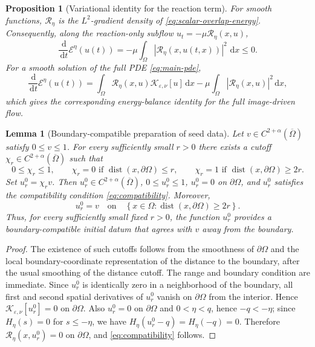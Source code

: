\documentclass[11pt]{article}
\newtheorem{proposition}[theorem]{Proposition}
\newtheorem{lemma}[theorem]{Lemma}
\theoremstyle{remark}
\newcommand{\eps}{\varepsilon}
\newcommand{\nupar}{\nu}
\newcommand{\dd}{\,\mathrm{d}}
\newcommand{\cK}{\mathcal{K}}
\newcommand{\cT}{\mathcal{R}}
\newcommand{\cE}{\mathcal{E}}
\begin{document}
\begin{proposition}[Variational identity for the reaction term]\label{prop:energy}
For smooth functions, $\cT_\eta$ is the $L^2$-gradient density of \eqref{eq:scalar-overlap-energy}.  Consequently, along the reaction-only subflow $u_t=-\mu\cT_\eta(x,u)$,
\begin{equation}\label{eq:energy-dissipation}
        \frac{\dd}{\dd t}\cE^\eta(u(t))
        =-\mu\int_\Omega |\cT_\eta(x,u(t,x))|^2\,\dd x\le0.
\end{equation}
For a smooth solution of the full PDE \eqref{eq:main-pde},
\[
        \frac{\dd}{\dd t}\cE^\eta(u(t))
        =\int_\Omega\cT_\eta(x,u)\cK_{\eps,\nupar}[u] \dd x
        -\mu\int_\Omega |\cT_\eta(x,u)|^2\dd x,
\]
which gives the corresponding energy-balance identity for the full image-driven flow.
\end{proposition}

\begin{lemma}[Boundary-compatible preparation of seed data]\label{lem:seed-preparation}
Let $v\in C^{2+\alpha}(\overline\Omega)$ satisfy $0\le v\le1$.  For every sufficiently small $r>0$ there exists a cutoff $\chi_r\in C^{2+\alpha}(\overline\Omega)$ such that
\[
        0\le \chi_r\le1,\qquad
        \chi_r=0 \text{ if } \operatorname{dist}(x,\partial\Omega)\le r,
        \qquad
        \chi_r=1 \text{ if } \operatorname{dist}(x,\partial\Omega)\ge 2r .
\]
Set $u_r^0=\chi_r v$. Then
$u_r^0\in C^{2+\alpha}(\overline{\Omega})$,
$0\leq u_r^0\leq 1$,
$u_r^0=0$ on $\partial\Omega$, and
$u_r^0$ satisfies the compatibility condition
\eqref{eq:compatibility}. Moreover,
\[
u_r^0=v
\quad\text{on}\quad
\left\{
x\in\Omega:
\operatorname{dist}(x,\partial\Omega)\geq 2r
\right\}.
\]
Thus, for every sufficiently small fixed $r>0$, the function $u_r^0$
provides a boundary-compatible initial datum that agrees with $v$
away from the boundary.
\end{lemma}

\begin{proof}
The existence of such cutoffs follows from the smoothness of $\partial\Omega$ and the local boundary-coordinate representation of the distance to the boundary, after the usual smoothing of the distance cutoff.  The range and boundary condition are immediate.  Since $u^0_r$ is identically zero in a neighborhood of the boundary, all first and second spatial derivatives of $u^0_r$ vanish on $\partial\Omega$ from the interior.  Hence $\cK_{\eps,\nupar}[u^0_r]=0$ on $\partial\Omega$.  Also $u^0_r=0$ on $\partial\Omega$ and $0<\eta<q$, hence $-q<-\eta$; since $H_\eta(s)=0$ for $s\le-\eta$, we have $H_\eta(u^0_r-q)=H_\eta(-q)=0$.  Therefore $\cT_\eta(x,u^0_r)=0$ on $\partial\Omega$, and \eqref{eq:compatibility} follows.
\end{proof}
\end{document}
